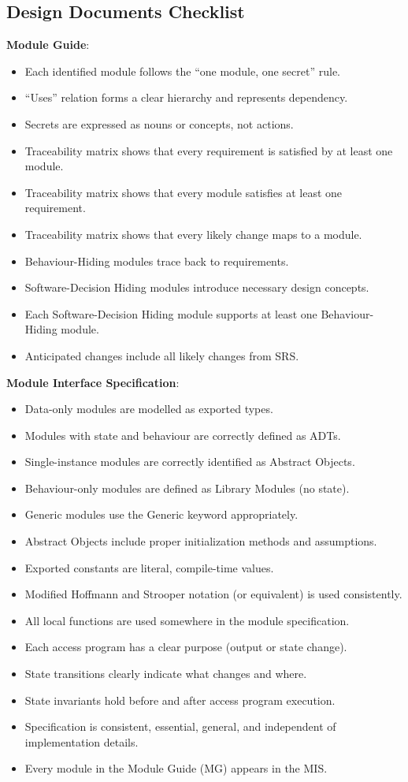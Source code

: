 \documentclass[12pt, titlepage]{article}
\begin{document}
\subsection{Design Documents Checklist}
\label{appendix:dd_checklist}
\textbf{Module Guide}:
\begin{itemize}
  \item Each identified module follows the “one module, one secret” rule.
  \item “Uses” relation forms a clear hierarchy and represents dependency.
  \item Secrets are expressed as nouns or concepts, not actions.
  \item Traceability matrix shows that every requirement is satisfied
    by at least one module.
  \item Traceability matrix shows that every module satisfies at least
    one requirement.
  \item Traceability matrix shows that every likely change maps to a module.
  \item Behaviour-Hiding modules trace back to requirements.
  \item Software-Decision Hiding modules introduce necessary design concepts.
  \item Each Software-Decision Hiding module supports at least one
    Behaviour-Hiding module.
  \item Anticipated changes include all likely changes from SRS.
\end{itemize}

\textbf{Module Interface Specification}:
\begin{itemize}
  \item Data-only modules are modelled as exported types.
  \item Modules with state and behaviour are correctly defined as ADTs.
  \item Single-instance modules are correctly identified as Abstract Objects.
  \item Behaviour-only modules are defined as Library Modules (no state).
  \item Generic modules use the Generic keyword appropriately.
  \item Abstract Objects include proper initialization methods and assumptions.
  \item Exported constants are literal, compile-time values.
  \item Modified Hoffmann and Strooper notation (or equivalent) is used
    consistently.
  \item All local functions are used somewhere in the module specification.
  \item Each access program has a clear purpose (output or state change).
  \item State transitions clearly indicate what changes and where.
  \item State invariants hold before and after access program execution.
  \item Specification is consistent, essential, general, and
    independent of implementation details.
  \item Every module in the Module Guide (MG) appears in the MIS.
\end{itemize}
\end{document}
